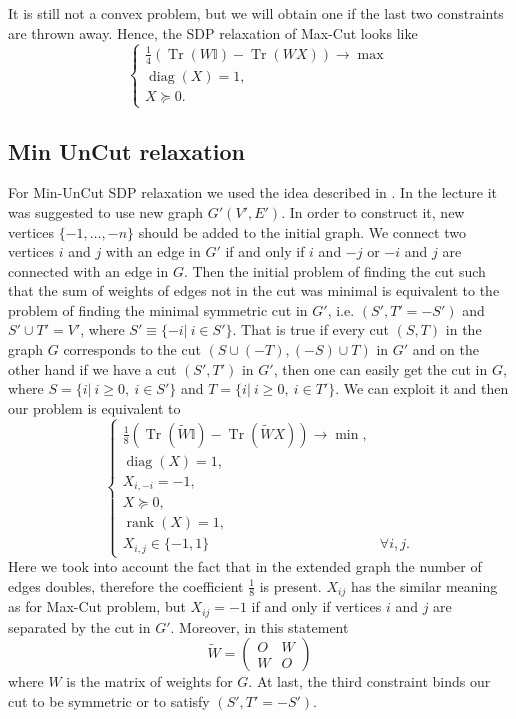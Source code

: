 \documentclass[12pt]{article}
\DeclareMathOperator{\trace}{Tr}
\DeclareMathOperator{\diag}{diag}
\DeclareMathOperator{\rank}{rank}
\begin{document}
It is  still not a convex problem, but we will obtain one if the last two constraints are 
thrown away. Hence, the SDP relaxation of Max-Cut looks like
\begin{equation}
\label{maxcut_rel}
\begin{cases}
\frac 14 \left(\trace(W \mathbb{I}) - \trace(W X)\right) \longrightarrow \max\\
\diag(X) = 1,\\
X \succeq 0.
\end{cases}
\end{equation}

\subsection{Min UnCut relaxation}

For Min-UnCut SDP relaxation we used the idea described in \cite{Arora}. In the lecture 
it was suggested to use new graph $G'(V', E')$. In order to construct it, new vertices 
$\{-1, \dots, -n \}$ should be added to the initial graph. We connect two vertices $i$ and 
$j$ with an edge in $G'$ if and only if $i$ and $-j$ or $-i$ and $j$ are connected with an 
edge in $G$. Then the initial problem of finding the cut such that the sum of weights of 
edges not in the cut was minimal is equivalent to the problem of finding the minimal 
symmetric cut in $G'$, i.e. $(S', T' = -S')$ and $S' \cup T' = V'$, where $S' \equiv \{ -i | 
~i\in S'\} $. That is true if every cut $(S, T)$ in the graph $G$ corresponds to the cut $(S 
\cup (-T), (-S) \cup T)$ in $G'$ and on the other hand if we have a cut $(S', T')$ in $G'$, 
then one can easily get the cut in $G$, where $S = \{i|~ i \geq 0, ~i\in S'\}$ and $T = \{i| ~ 
i \geq 0, ~i\in T' \}$. We can exploit it and then our problem is equivalent to 
\[
\begin{cases}
\frac 18 \left(\trace(\tilde W \mathbb{I}) - \trace(\tilde W X)\right) \longrightarrow \min,  
&\\
\diag(X) = 1, &\\
X_{i, -i} = -1, &\\
X \succeq 0, &\\
\rank(X) = 1,  &\\
X_{i,j} \in \{-1,1\} & \forall i, j.
\end{cases}
\]
Here we took into account the fact that in the extended graph the number of edges 
doubles, therefore the coefficient $\frac 18$ is present. $X_{ij}$ has the similar meaning 
as for Max-Cut problem, but $X_{ij} = -1$ if and only if vertices $i$ and $j$ are separated 
by the cut in $G'$. Moreover, in this statement
\[
\tilde W = \begin{pmatrix} O & W \\ W & O\end{pmatrix}
\]
where $W$ is the matrix of weights for $G$. At last, the third constraint binds our cut to 
be symmetric or to satisfy $(S', T' = -S')$. 
\end{document}
